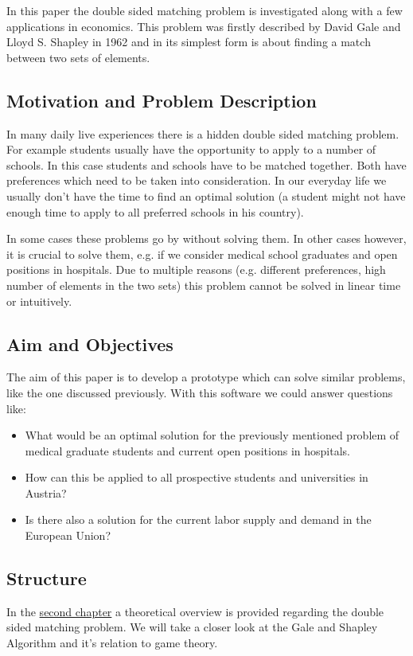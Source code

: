 \label{introduction}
In this paper the double sided matching problem is investigated along with a few applications in economics.
This problem was firstly described by David Gale and Lloyd S. Shapley in 1962 \cite{gale62a} and in its simplest form is about finding a match between two sets of elements.

\subsection{Motivation and Problem Description}
In many daily live experiences there is a hidden double sided matching problem. 
For example students usually have the opportunity to apply to a number of schools. 
In this case students and schools have to be matched together. 
Both have preferences which need to be taken into consideration. 
In our everyday life we usually don't have the time to find an optimal solution (a student might not have enough time to apply to all preferred schools in his country). 

In some cases these problems go by without solving them. 
In other cases however, it is crucial to solve them, e.g. if we consider medical school graduates and open positions in hospitals. 
Due to multiple reasons (e.g. different preferences, high number of elements in the two sets) this problem cannot be solved in linear time or intuitively.

\subsection{Aim and Objectives}
The aim of this paper is to develop a prototype which can solve similar problems, like the one discussed previously.
With this software we could answer questions like:
\begin{itemize}
			\item What would be an optimal solution for the previously mentioned problem of medical graduate students and current open positions in hospitals.
			\item How can this be applied to all prospective students and universities in Austria?
			\item Is there also a solution for the current labor supply and demand in the European Union?
			\end{itemize}

\subsection{Structure}
In the \hyperref[theory]{second chapter} a theoretical overview is provided regarding the double sided matching problem.
We will take a closer look at the Gale and Shapley Algorithm and it's relation to game theory.


